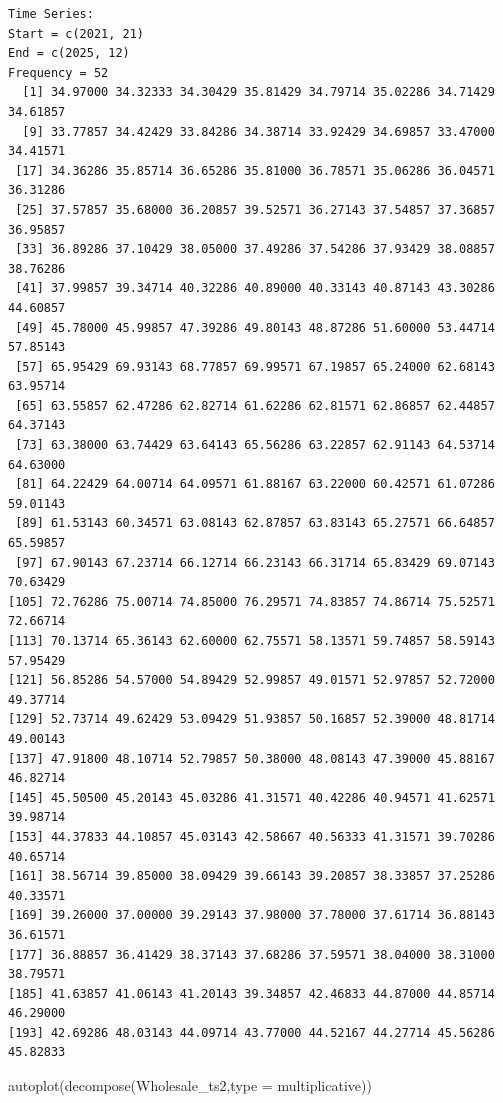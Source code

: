\documentclass[
  letterpaper,
  DIV=11,
  numbers=noendperiod]{scrartcl}
\newenvironment{Shaded}{\begin{snugshade}}{\end{snugshade}}
\newcommand{\AttributeTok}[1]{\textcolor[rgb]{0.40,0.45,0.13}{#1}}
\newcommand{\FunctionTok}[1]{\textcolor[rgb]{0.28,0.35,0.67}{#1}}
\newcommand{\NormalTok}[1]{\textcolor[rgb]{0.00,0.23,0.31}{#1}}
\newcommand{\StringTok}[1]{\textcolor[rgb]{0.13,0.47,0.30}{#1}}
\begin{document}
\begin{verbatim}
Time Series:
Start = c(2021, 21) 
End = c(2025, 12) 
Frequency = 52 
  [1] 34.97000 34.32333 34.30429 35.81429 34.79714 35.02286 34.71429 34.61857
  [9] 33.77857 34.42429 33.84286 34.38714 33.92429 34.69857 33.47000 34.41571
 [17] 34.36286 35.85714 36.65286 35.81000 36.78571 35.06286 36.04571 36.31286
 [25] 37.57857 35.68000 36.20857 39.52571 36.27143 37.54857 37.36857 36.95857
 [33] 36.89286 37.10429 38.05000 37.49286 37.54286 37.93429 38.08857 38.76286
 [41] 37.99857 39.34714 40.32286 40.89000 40.33143 40.87143 43.30286 44.60857
 [49] 45.78000 45.99857 47.39286 49.80143 48.87286 51.60000 53.44714 57.85143
 [57] 65.95429 69.93143 68.77857 69.99571 67.19857 65.24000 62.68143 63.95714
 [65] 63.55857 62.47286 62.82714 61.62286 62.81571 62.86857 62.44857 64.37143
 [73] 63.38000 63.74429 63.64143 65.56286 63.22857 62.91143 64.53714 64.63000
 [81] 64.22429 64.00714 64.09571 61.88167 63.22000 60.42571 61.07286 59.01143
 [89] 61.53143 60.34571 63.08143 62.87857 63.83143 65.27571 66.64857 65.59857
 [97] 67.90143 67.23714 66.12714 66.23143 66.31714 65.83429 69.07143 70.63429
[105] 72.76286 75.00714 74.85000 76.29571 74.83857 74.86714 75.52571 72.66714
[113] 70.13714 65.36143 62.60000 62.75571 58.13571 59.74857 58.59143 57.95429
[121] 56.85286 54.57000 54.89429 52.99857 49.01571 52.97857 52.72000 49.37714
[129] 52.73714 49.62429 53.09429 51.93857 50.16857 52.39000 48.81714 49.00143
[137] 47.91800 48.10714 52.79857 50.38000 48.08143 47.39000 45.88167 46.82714
[145] 45.50500 45.20143 45.03286 41.31571 40.42286 40.94571 41.62571 39.98714
[153] 44.37833 44.10857 45.03143 42.58667 40.56333 41.31571 39.70286 40.65714
[161] 38.56714 39.85000 38.09429 39.66143 39.20857 38.33857 37.25286 40.33571
[169] 39.26000 37.00000 39.29143 37.98000 37.78000 37.61714 36.88143 36.61571
[177] 36.88857 36.41429 38.37143 37.68286 37.59571 38.04000 38.31000 38.79571
[185] 41.63857 41.06143 41.20143 39.34857 42.46833 44.87000 44.85714 46.29000
[193] 42.69286 48.03143 44.09714 43.77000 44.52167 44.27714 45.56286 45.82833
\end{verbatim}

\begin{Shaded}
\begin{Highlighting}[]
\FunctionTok{autoplot}\NormalTok{(}\FunctionTok{decompose}\NormalTok{(Wholesale\_ts2,}\AttributeTok{type =} \StringTok{\textquotesingle{}multiplicative\textquotesingle{}}\NormalTok{))}
\end{Highlighting}
\end{Shaded}
\end{document}

